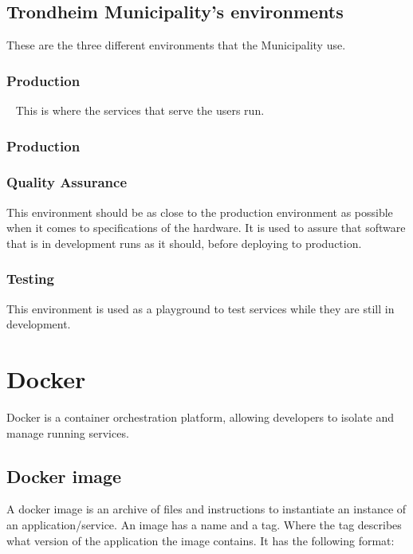 \subsection{Trondheim Municipality's environments}
These are the three different environments that the Municipality use.
\subsubsection{Production}~
This is where the services that serve the users run.

\subsubsection{Production}


\subsubsection{Quality Assurance}
This environment should be as close to the production environment as possible when it comes to specifications of the hardware. It is used to assure that software that is in development runs as it should, before deploying to production.

\subsubsection{Testing}
This environment is used as a playground to test services while they are still in development.

\section{Docker}
Docker is a container orchestration platform, allowing developers to isolate and manage running services.

\subsection{Docker image}
A docker image is an archive of files and instructions to instantiate an instance of an application/service.
\newline
An image has a name and a tag. Where the tag describes what version of the application the image contains. \newline
It has the following format: 


